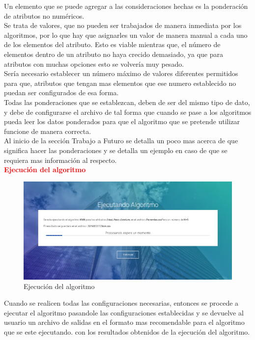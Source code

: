 Un elemento que se puede agregar a las consideraciones hechas es la ponderación de atributos no numéricos.\\
Se trata de valores, que no pueden ser trabajados de manera inmediata por los algoritmos, por lo que hay que asignarles un valor de manera manual a cada uno de los elementos del atributo. Esto es viable mientras que, el número de elementos dentro de un atributo no haya crecido demasiado, ya que para atributos con muchas opciones esto se volvería muy pesado.\\
Sería necesario establecer un número máximo de valores diferentes permitidos para que, atributos que tengan mas elementos que ese numero establecido no puedan ser configurados de esa forma.\\
Todas las ponderaciones que se establezcan, deben de ser del mismo tipo de dato, y debe de configurarse el archivo de tal forma que cuando se pase a los algoritmos pueda leer los datos ponderados para que el algoritmo que se pretende utilizar funcione de manera correcta.\\
Al inicio de la sección Trabajo a Futuro se detalla un poco mas acerca de que significa hacer las ponderaciones y se detalla un ejemplo en caso de que se requiera mas información al respecto.\\
\newpage
\textbf{\textcolor{red}{Ejecución del algoritmo}}
\\
\begin{figure}[H]
	\hypertarget{fig:red}{\hspace{1pt}}
	\begin{center}
		\includegraphics[width=1\textwidth]{capitulo7/images/ejecutar.png}
		\caption{Ejecución del algoritmo}
		\label{fig:pond}
	\end{center}
\end{figure}
Cuando se realicen todas las configuraciones necesarias, entonces se procede a ejecutar el algoritmo pasandole las configuraciones establecidas y se devuelve al usuario un archivo de salidas en el formato mas recomendable para el algoritmo que se este ejecutando. con los resultados obtenidos de la ejecución del algoritmo.